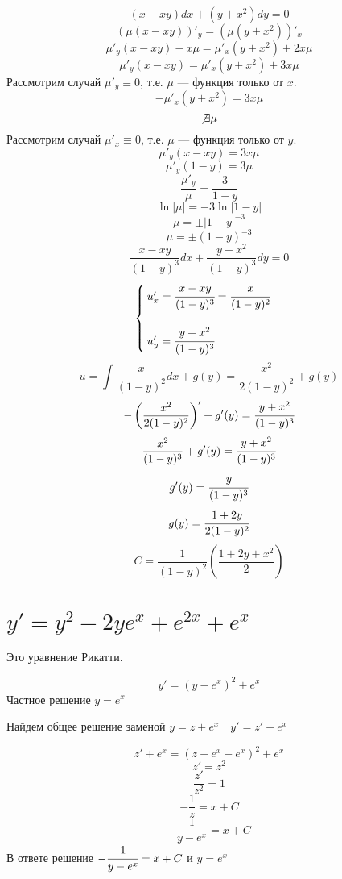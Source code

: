\[(x-xy)dx + (y+x^2)dy = 0\]
\[(\mu(x-xy))'_y=(\mu(y+x^2))'_x\]
\[\mu'_y(x-xy) - x\mu=\mu'_x(y+x^2) + 2x\mu\]
\[\mu'_y(x-xy)=\mu'_x(y+x^2) + 3x\mu\]
Рассмотрим случай $\mu'_y\equiv0$, т.е. $\mu$ --- функция только от $x$.
\[-\mu'_x(y+x^2) = 3x\mu\]
\[\not\exists \mu\]
Рассмотрим случай $\mu'_x\equiv0$, т.е. $\mu$ --- функция только от $y$.
\[\mu'_y(x-xy)=3x\mu\]
\[\mu'_y(1-y)=3\mu\]
\[\frac{\mu'_y}{\mu}=\frac{3}{1-y}\]
\[\ln|\mu|=-3\ln|1-y|\]
\[\mu=\pm |1-y|^{-3}\]
\[\mu=\pm (1-y)^{-3}\]
\[\frac{x-xy}{(1-y)^3}dx + \frac{y+x^2}{(1-y)^3}dy = 0\]
\[\begin{cases}
        u'_x = \cfrac{x-xy}{(1-y)^3} = \cfrac{x}{(1-y)^2} \\
        \\
        u'_y = \cfrac{y+x^2}{(1-y)^3}
    \end{cases}\]
\[u = \int \frac{x}{(1-y)^2} dx + g(y) = \frac{x^2}{2(1-y)^2} + g(y)\]
\[-\left(\frac{x^2}{2(1-y)^2}\right)' + g'(y) = \cfrac{y+x^2}{(1-y)^3}\]
\[\frac{x^2}{(1-y)^3} + g'(y) = \cfrac{y+x^2}{(1-y)^3}\]
\[g'(y) = \cfrac{y}{(1-y)^3}\]
\[g(y) = \cfrac{1+2y}{2(1-y)^2}\]
\[C = \frac{1}{(1-y)^2}\left(\frac{1+2y+x^2}{2}\right)\]

\section{$y'=y^2-2ye^x+e^{2x}+e^x$}

Это уравнение Рикатти.

\[y' = (y - e^x)^2 + e^x\]
Частное решение $y = e^x$

Найдем общее решение заменой $y = z + e^x \quad y' = z' + e^x$

\[z' + e^x = (z + e^x - e^x)^2 + e^x\]
\[z' = z^2\]
\[\frac{z'}{z^2} = 1\]
\[-\frac{1}{z} = x + C\]
\[-\frac{1}{y - e^x} = x + C\]
В ответе решение $-\cfrac{1}{y - e^x} = x + C$ и $y = e^x$

